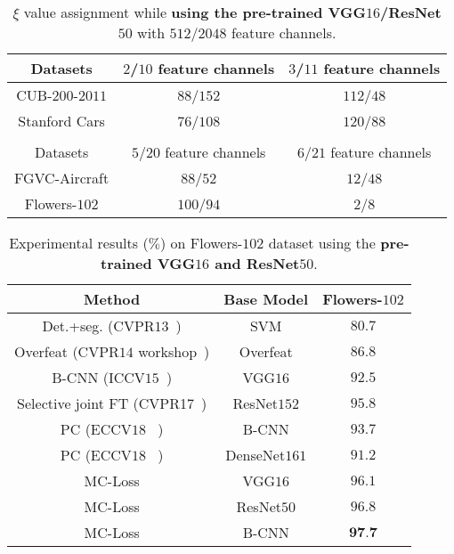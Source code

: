 \documentclass[journal]{IEEEtran}
\begin{document}
\begin{table}[!t]
  \centering
  \small
\caption{$\xi$ value assignment while \textbf{using the pre-trained VGG$16$/ResNet$50$} with $512$/$2048$ feature channels.}
    \begin{tabular}{|c|c|c|}
    \hline
    Datasets              &  $2$/$10$ feature channels   &  $3$/$11$ feature channels \\
    \hline
    \hline
    CUB-$200$-$2011$      &$88$/$152$                    &$112$/$48$ \\
    Stanford Cars         &$76$/$108$                    &$120$/$88$  \\
    \hline

    \multicolumn{1}{r}{}  & \multicolumn{1}{r}{}         & \multicolumn{1}{r}{} \\
    \hline 
    Datasets              &$5$/$20$  feature channels    & $6$/$21$ feature channels \\
    \hline
    \hline
    FGVC-Aircraft         &$88$/$52$                     &$12$/$48$\\
    Flowers-$102$         &$100$/$94$                    &$2$/$8$ \\
    \hline
    \end{tabular}\label{tab:featuremaps}\end{table}

\begin{table}[!t]
\centering
  \caption{Experimental results ($\%$) on Flowers-$102$ dataset using the \textbf{pre-trained VGG$16$ and ResNet$50$}.}
\footnotesize
    \begin{tabular}{|c|c|c|}
    \hline
    Method                                             & Base Model              & Flowers-$102$ \\
    \hline
    \hline
    Det.+seg. (CVPR$13$~\cite{angelova2013efficient})  & SVM                     &$80.7$ \\
    Overfeat (CVPR$14$ workshop~\cite{sharif2014cnn})  & Overfeat                &$86.8$ \\
B-CNN (ICCV$15$~\cite{lin2015bilinear})            & VGG$16$                 &$92.5$ \\
    Selective joint FT (CVPR17~\cite{ge2017borrowing}) & ResNet$152$             &$95.8$ \\
    PC (ECCV$18$~\cite{dubey2018pairwise} )            & B-CNN                   &$93.7$ \\
    PC (ECCV$18$~\cite{dubey2018pairwise} )            & DenseNet$161$           &$91.2$ \\
    \hline
    \hline
    MC-Loss                                            & VGG$16$                 &$96.1$ \\
    MC-Loss                                            & ResNet$50$              &$96.8$ \\
    MC-Loss                                            & B-CNN                   &$\textbf{97.7}$ \\
    \hline
    \end{tabular}\label{tab:SOTA_flowers102}

\end{table}
\end{document}

